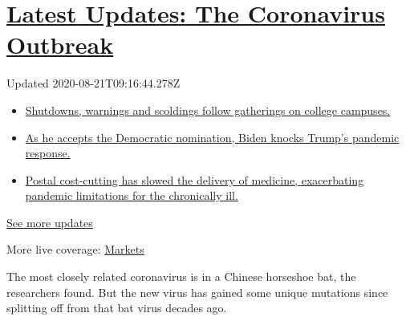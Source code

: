 \hypertarget{latest-updates-the-coronavirus-outbreak}{%
\section{\texorpdfstring{\href{https://www.nytimes3xbfgragh.onion/2020/08/21/world/covid-19-coronavirus.html?action=click\&pgtype=Article\&state=default\&region=MAIN_CONTENT_1\&context=storylines_live_updates}{Latest
Updates: The Coronavirus
Outbreak}}{Latest Updates: The Coronavirus Outbreak}}\label{latest-updates-the-coronavirus-outbreak}}

Updated 2020-08-21T09:16:44.278Z

\begin{itemize}
\tightlist
\item
  \href{https://www.nytimes3xbfgragh.onion/2020/08/21/world/covid-19-coronavirus.html?action=click\&pgtype=Article\&state=default\&region=MAIN_CONTENT_1\&context=storylines_live_updates\#link-4690b6aa}{Shutdowns,
  warnings and scoldings follow gatherings on college campuses.}
\item
  \href{https://www.nytimes3xbfgragh.onion/2020/08/21/world/covid-19-coronavirus.html?action=click\&pgtype=Article\&state=default\&region=MAIN_CONTENT_1\&context=storylines_live_updates\#link-324af071}{As
  he accepts the Democratic nomination, Biden knocks Trump's pandemic
  response.}
\item
  \href{https://www.nytimes3xbfgragh.onion/2020/08/21/world/covid-19-coronavirus.html?action=click\&pgtype=Article\&state=default\&region=MAIN_CONTENT_1\&context=storylines_live_updates\#link-1c47e0d0}{Postal
  cost-cutting has slowed the delivery of medicine, exacerbating
  pandemic limitations for the chronically ill.}
\end{itemize}

\href{https://www.nytimes3xbfgragh.onion/2020/08/21/world/covid-19-coronavirus.html?action=click\&pgtype=Article\&state=default\&region=MAIN_CONTENT_1\&context=storylines_live_updates}{See
more updates}

More live coverage:
\href{https://www.nytimes3xbfgragh.onion/live/2020/08/20/business/stock-market-today-coronavirus?action=click\&pgtype=Article\&state=default\&region=MAIN_CONTENT_1\&context=storylines_live_updates}{Markets}

The most closely related coronavirus is in a Chinese horseshoe bat, the
researchers found. But the new virus has gained some unique mutations
since splitting off from that bat virus decades ago.

